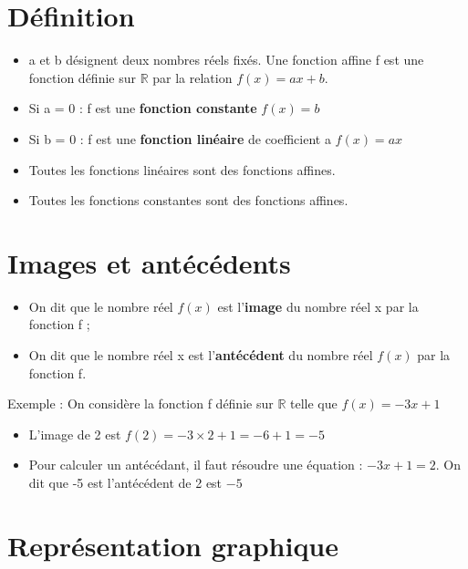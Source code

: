 \documentclass{article}
\begin{document}
\section{\textbf{Définition}}

\begin{itemize}
    \item a et b désignent deux nombres réels fixés. Une fonction affine f est une fonction définie sur \(\mathbb{R}\) par la relation \(f(x)=ax+b\).
    \item Si a = 0 : f est une \textbf{fonction constante} \(f(x)=b\)
    \item Si b = 0 : f est une \textbf{fonction linéaire} de coefficient a \(f(x)=ax\)
    \vspace*{1cm}
    \item Toutes les fonctions linéaires sont des fonctions affines.
    \item Toutes les fonctions constantes sont des fonctions affines.
\end{itemize}

\section{\textbf{Images et antécédents}}
\begin{itemize}
    \item On dit que le nombre réel \(f(x)\) est l'\textbf{image} du nombre réel x par la fonction f ; 
    \item On dit que le nombre réel x est l'\textbf{antécédent} du nombre réel \(f(x)\) par la fonction f.
\end{itemize}

Exemple : On considère la fonction f définie sur \(\mathbb{R}\) telle que \(f(x)=-3x+1\)
\begin{itemize}
    \item L'image de 2 est \(f(2)=-3 \times 2 + 1 = -6+1 = -5\)
    \item Pour calculer un antécédant, il faut résoudre une équation :  \(-3x+1=2\). On dit que -5 est l'antécédent de 2 est \(-5\)
\end{itemize}

\section{\textbf{Représentation graphique}}
\end{document}
